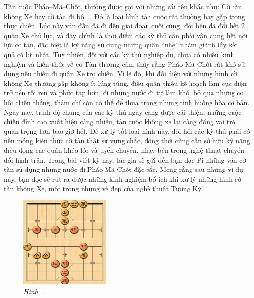 \vspace*{160pt}
\begin{multicols}{2}
	Tàn cuộc Pháo--Mã--Chốt, thường được gọi với những cái tên khác như: Cờ tàn không Xe hay cờ tàn đi bộ ... Đó là loại hình tàn cuộc rất thường hay gặp trong thực chiến. Lúc này ván đấu đã đi đến giai đoạn cuối cùng, đôi bên đã đổi hết $2$ quân Xe chủ lực, và đây chính là thời điểm các kỳ thủ cần phải vận dụng hết nội lực cờ tàn, đặc biệt là kỹ năng sử dụng những quân ``nhẹ" nhằm giành lấy  kết quả có lợi nhất.
	\vskip 0.1cm
	Tuy nhiên, đối với các kỳ thủ nghiệp dư, chưa có nhiều kinh nghiệm và kiến thức về cờ Tàn thường cảm thầy rằng Pháo Mã Chốt rất khó sử dụng nếu thiếu đi quân Xe trợ chiến. Vì lẽ đó, khi đối diện với những hình cờ không Xe thường gặp không ít lúng túng, điều quân thiếu kế hoạch làm cục diện trở nên rối ren và phức tạp hơn, đi những nước đi tự làm khó, bỏ qua những cơ hội chiến thắng, thậm chí còn có thể để thua trong những tình huống hòa cơ bản.
	\vskip 0.1cm
	Ngày nay, trình độ chung của các kỳ thủ ngày càng được cải thiện, những cuộc chiến đỉnh cao xuất hiện càng nhiều, tàn cuộc không xe lại càng đóng vai trò quan trọng hơn bao giờ hết. Để xử lý tốt loại hình này, đòi hỏi các kỳ thủ phải có nền móng kiến thức cờ tàn thật sự vững chắc, đồng thời cũng cần sở hữu kỹ năng điều động các quân khéo léo và uyển chuyển, nhạy bén trong nghệ thuật chuyển đổi hình trận.
	\vskip 0.1cm
	Trong bài viết kỳ này, tác giả sẽ gửi đến bạn đọc Pi những ván cờ tàn sử dụng những nước đi Pháo Mã Chốt đặc sắc. Mong rằng sau những ví dụ này, bạn đọc sẽ rút ra được những kinh nghiệm bổ ích khi xử lý những hình cờ tàn không Xe, một trong những vẻ đẹp của nghệ thuật Tượng Kỳ.
	\begin{figure}[H]
		\centering
		\vspace*{-5pt}
		\captionsetup{labelformat= empty, justification=centering}
		\includegraphics[width=0.4\textwidth]{1}
		\caption{\small\textit{\color{gocco}Hình $1$.}}
		\vspace*{-10pt}
	\end{figure}

\end{multicols}
